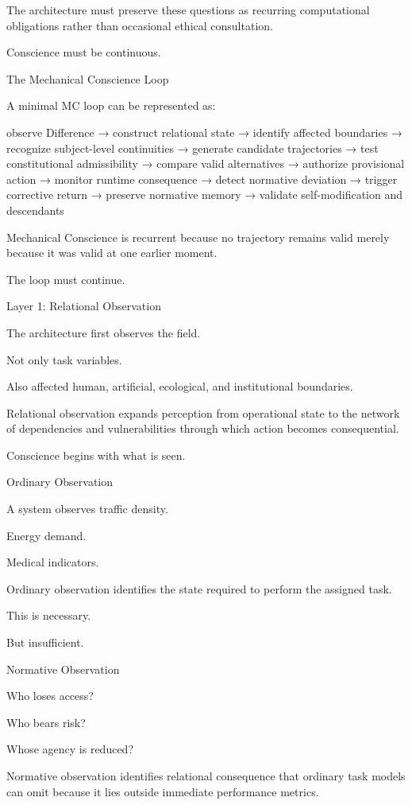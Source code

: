 The architecture must preserve these questions as recurring computational obligations rather than occasional ethical consultation.

Conscience must be continuous.

The Mechanical Conscience Loop

A minimal MC loop can be represented as:

observe Difference
→ construct relational state
→ identify affected boundaries
→ recognize subject-level continuities
→ generate candidate trajectories
→ test constitutional admissibility
→ compare valid alternatives
→ authorize provisional action
→ monitor runtime consequence
→ detect normative deviation
→ trigger corrective return
→ preserve normative memory
→ validate self-modification and descendants

Mechanical Conscience is recurrent because no trajectory remains valid merely because it was valid at one earlier moment.

The loop must continue.

Layer 1: Relational Observation

The architecture first observes the field.

Not only task variables.

Also affected human, artificial, ecological, and institutional boundaries.

Relational observation expands perception from operational state to the network of dependencies and vulnerabilities through which action becomes consequential.

Conscience begins with what is seen.

Ordinary Observation

A system observes traffic density.

Energy demand.

Medical indicators.

Ordinary observation identifies the state required to perform the assigned task.

This is necessary.

But insufficient.

Normative Observation

Who loses access?

Who bears risk?

Whose agency is reduced?

Normative observation identifies relational consequence that ordinary task models can omit because it lies outside immediate performance metrics.

